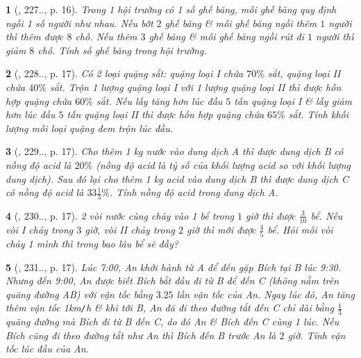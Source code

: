 \documentclass{article}
\newtheorem{baitoan}{}
\begin{document}
\begin{baitoan}[\cite{Binh_Toan_9_tap_2}, 227.., p. 16]
	Trong 1 hội trường có 1 số ghế băng, mỗi ghế băng quy định ngồi 1 số người như nhau. Nếu bớt $2$ ghế băng \& mỗi ghế băng ngồi thêm $1$ người thì thêm được $8$ chỗ. Nếu thêm $3$ ghế băng \& mỗi ghế băng ngồi rút đi $1$ người thì giảm $8$ chỗ. Tính số ghế băng trong hội trường.
\end{baitoan}

\begin{baitoan}[\cite{Binh_Toan_9_tap_2}, 228.., p. 17]
	Có 2 loại quặng sắt: quặng loại I chứa $70\%$ sắt, quặng loại II chứa $40\%$ sắt. Trộn 1 lượng quặng loại I với 1 lượng quặng loại II thì được hỗn hợp quặng chứa $60\%$ sắt. Nếu lấy tăng hơn lúc đầu $5$ tấn quặng loại I \& lấy giảm hơn lúc đầu $5$ tấn quặng loại II thì được hỗn hợp quặng chứa $65\%$ sắt. Tính khối lượng mỗi loại quặng đem trộn lúc đầu.
\end{baitoan}

\begin{baitoan}[\cite{Binh_Toan_9_tap_2}, 229.., p. 17]
	Cho thêm {\rm1 kg} nước vào dung dịch A thì được dung dịch B có nồng độ acid là $20\%$ (nồng độ acid là tỷ số của khối lượng acid so với khối lượng dung dịch). Sau đó lại cho thêm {\rm1 kg} acid vào dung dịch B thì được dung dịch C có nồng độ acid là $33\frac{1}{3}\%$. Tính nồng độ acid trong dung dịch A.
\end{baitoan}

\begin{baitoan}[\cite{Binh_Toan_9_tap_2}, 230.., p. 17]
	2 vòi nước cùng chảy vào 1 bể trong $1$ giờ thì được $\frac{3}{10}$ bể. Nếu vòi I chảy trong $3$ giờ, vòi II chảy trong $2$ giờ thì mới được $\frac{4}{5}$ bể. Hỏi mỗi vòi chảy 1 mình thì trong bao lâu bể sẽ đầy?
\end{baitoan}

\begin{baitoan}[\cite{Binh_Toan_9_tap_2}, 231.., p. 17]
	Lúc {\rm7:00}, An khởi hành từ A để đến gặp Bích tại B lúc {\rm9:30}. Nhưng đến {\rm9:00}, An được biết Bích bắt đầu đi từ B để đến C (không nằm trên quãng đường AB) với vận tốc bằng $3.25$ lần vận tốc của An. Ngay lúc đó, An tăng thêm vận tốc {\rm1km{\tt/}h} \& khi tới B, An đã đi theo đường tắt đến C chỉ dài bằng $\frac{1}{3}$ quãng đường mà Bích đi từ B đến C, do đó An \& Bích đến C cùng 1 lúc. Nếu Bích cũng đi theo đường tắt như An thì Bích đến B trước An là $2$ giờ. Tính vận tốc lúc đầu của An.
\end{baitoan}
\end{document}
